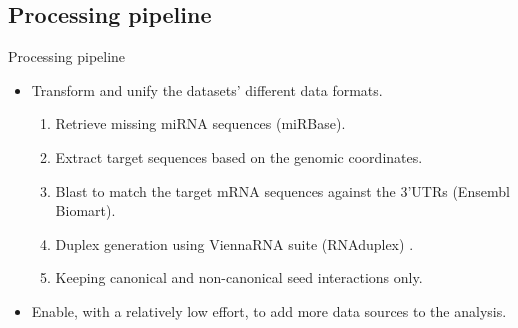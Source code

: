 \documentclass{beamer}
\begin{document}
\subsection{Processing pipeline}
\begin{frame}{Processing pipeline}
\begin{itemize}
\item Transform and unify the datasets' different data formats.
\begin{enumerate}
\item Retrieve missing miRNA sequences (miRBase).
\item Extract target sequences based on the genomic coordinates. 
\item Blast \cite{altschul1990basic_blast} to match the target mRNA sequences against the 3'UTRs (Ensembl Biomart).
\item Duplex generation using ViennaRNA suite (RNAduplex) \cite{lorenz2011viennarna}.
\item Keeping canonical and non-canonical seed interactions only.
\end{enumerate}
\item Enable, with a relatively low effort, to add more data sources to the analysis.
\end{itemize}
 \end{frame}



\begin{table}[h!]
\caption{Data processing pipeline}
\label{tab:preprocess}

\end{table}
\end{document}
